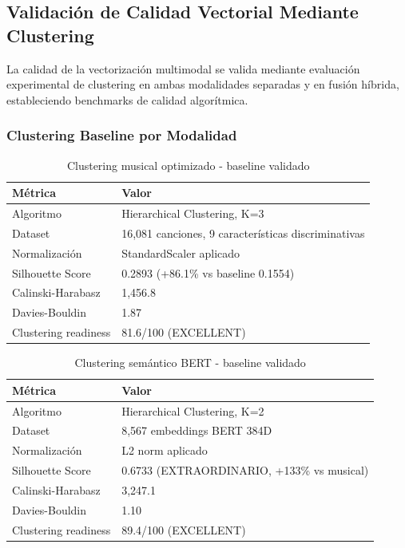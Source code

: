 \documentclass[12pt,a4paper]{report}
\begin{document}
\subsection{Validación de Calidad Vectorial Mediante Clustering}

La calidad de la vectorización multimodal se valida mediante evaluación experimental de clustering en ambas modalidades separadas y en fusión híbrida, estableciendo benchmarks de calidad algorítmica.

\subsubsection{Clustering Baseline por Modalidad}

\begin{table}[h]
\centering
\caption{Clustering musical optimizado - baseline validado}
\begin{tabular}{@{}ll@{}}
\toprule
\textbf{Métrica} & \textbf{Valor} \\
\midrule
Algoritmo & Hierarchical Clustering, K=3 \\
Dataset & 16,081 canciones, 9 características discriminativas \\
Normalización & StandardScaler aplicado \\
Silhouette Score & 0.2893 (+86.1\% vs baseline 0.1554) \\
Calinski-Harabasz & 1,456.8 \\
Davies-Bouldin & 1.87 \\
Clustering readiness & 81.6/100 (EXCELLENT) \\
\bottomrule
\end{tabular}
\end{table}

\begin{table}[h]
\centering
\caption{Clustering semántico BERT - baseline validado}
\begin{tabular}{@{}ll@{}}
\toprule
\textbf{Métrica} & \textbf{Valor} \\
\midrule
Algoritmo & Hierarchical Clustering, K=2 \\
Dataset & 8,567 embeddings BERT 384D \\
Normalización & L2 norm aplicado \\
Silhouette Score & 0.6733 (EXTRAORDINARIO, +133\% vs musical) \\
Calinski-Harabasz & 3,247.1 \\
Davies-Bouldin & 1.10 \\
Clustering readiness & 89.4/100 (EXCELLENT) \\
\bottomrule
\end{tabular}
\end{table}
\end{document}
